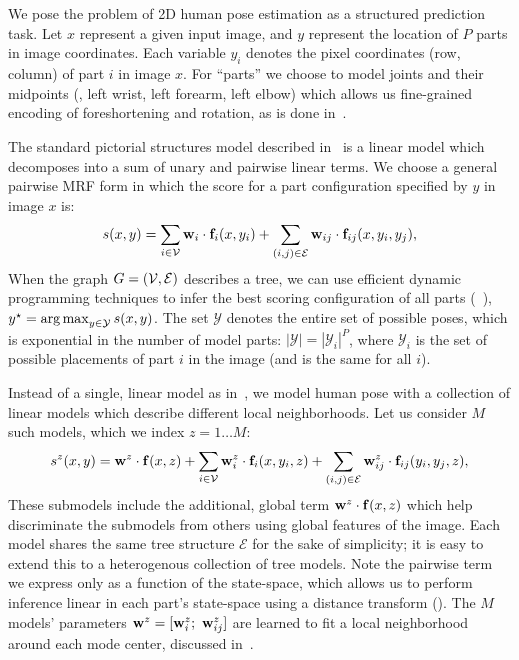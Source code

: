 \section{\LLPS}\label{sec:llps-model}

We pose the problem of 2D human pose estimation as a structured prediction 
task.  Let $x$ represent a given input image, and $y$ represent the location of 
$P$ parts in image coordinates.  Each variable $y_i$ denotes the pixel 
coordinates (row, column) of part $i$ in image $x$.  For ``parts'' we choose to 
model joints and their midpoints (\eg, left wrist, left forearm, left elbow) 
which allows us fine-grained encoding of foreshortening and rotation, as is 
done in~\citep{deva2011,sapp2011}.

The standard pictorial structures model described in~ is a linear 
model which decomposes into a sum of unary and pairwise linear terms.  We 
choose a general pairwise MRF form in which the score for a part configuration 
specified by $y$ in image $x$ is:
\begin{align}
 s(x,y) = \sum_{i \in \mathcal{V}} \mathbf{w}_i \cdot \mathbf{f}_i(x,y_i) + \sum_{(i,j) \in \mathcal{E}} 
\mathbf{w}_{ij} \cdot \mathbf{f}_{ij}(x,y_i,y_j),
 \label{eq:llps-ps}
\end{align}
When the graph $G = (\mathcal{V},\mathcal{E})$ describes a tree, we can use efficient dynamic 
programming techniques to infer the best scoring configuration of all parts 
(~), $y^\star = \mathop{\arg\max}_{y \in \mathcal{Y}} s(x,y)$.
The set $\mathcal{Y}$ denotes the entire set of possible poses, which is 
exponential in the number of model parts: $|\mathcal{Y}| = |\mathcal{Y}_i|^P$, 
where $\mathcal{Y}_i$ is the set of possible placements of part $i$ in the 
image (and is the same for all $i$).

Instead of a single, linear model as in~, we model human pose 
with a collection of linear models which describe different local 
neighborhoods.  Let us consider $M$ such models, which we index $z = 1 \ldots 
M$:
\begin{align}
s^z(x,y) = \mathbf{w}^z \cdot \mathbf{f}(x,z) +  \sum_{i \in \mathcal{V}} \mathbf{w}^z_i \cdot \mathbf{f}_i(x,y_i,z) + 
\sum_{(i,j) \in \mathcal{E}} \mathbf{w}^z_{ij} \cdot \mathbf{f}_{ij}(y_i,y_j,z),
\end{align}
These submodels include the additional, global term $\mathbf{w}^z \cdot \mathbf{f}(x,z)$ which 
help discriminate the submodels from others using global features of the image.  
Each model shares the same tree structure $\mathcal{E}$ for the sake of 
simplicity; it is easy to extend this to a heterogenous collection of tree 
models.  Note the pairwise term we express only as a function of the 
state-space, which allows us to perform inference linear in each part's 
state-space using a distance transform ().  The $M$ models' 
parameters $\mathbf{w}^z = [\mathbf{w}^z_i;~\mathbf{w}^z_{ij}]$ are learned to fit a local neighborhood 
around each mode center, discussed in~.

